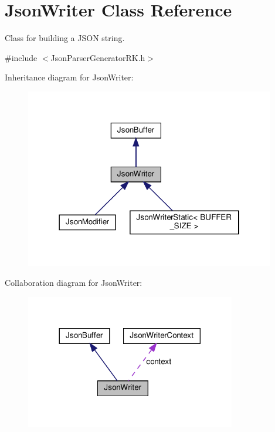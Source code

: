 \hypertarget{class_json_writer}{}\section{Json\+Writer Class Reference}
\label{class_json_writer}


Class for building a J\+S\+ON string.  




{\ttfamily \#include $<$Json\+Parser\+Generator\+R\+K.\+h$>$}



Inheritance diagram for Json\+Writer\+:
\nopagebreak
\begin{figure}[H]
\begin{center}
\leavevmode
\includegraphics[width=310pt]{class_json_writer__inherit__graph}
\end{center}
\end{figure}


Collaboration diagram for Json\+Writer\+:
\nopagebreak
\begin{figure}[H]
\begin{center}
\leavevmode
\includegraphics[width=260pt]{class_json_writer__coll__graph}
\end{center}
\end{figure}
